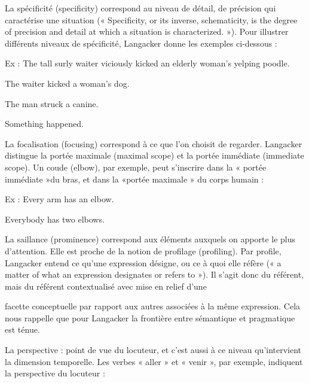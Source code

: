 \noindent{\color{BellaTeal}$\diamond$}\hspace{.6em}La spécificité (specificity) correspond au niveau de détail, de précision qui caractérise une situation (« Specificity, or its inverse, schematicity, is the degree of precision and detail at which a situation is characterized. »). Pour illustrer différents niveaux de spécificité, Langacker donne les exemples ci-dessous :\par

Ex : The tall surly waiter viciously kicked an elderly woman’s yelping poodle.\par

The waiter kicked a woman’s dog.\par The man struck a canine.\par Something happened.\par

\noindent{\color{BellaTeal}$\diamond$}\hspace{.6em}La focalisation (focusing) correspond à ce que l’on choisit de regarder. Langacker distingue la portée maximale (maximal scope) et la portée immédiate (immediate scope). Un coude (elbow), par exemple, peut s'inscrire dans la « portée immédiate »du bras, et dans la «portée maximale » du corps humain :\par

Ex : Every arm has an elbow.\par

Everybody has two elbows.\par

\noindent{\color{BellaTeal}$\diamond$}\hspace{.6em}La saillance (prominence) correspond aux éléments auxquels on apporte le plus d’attention. Elle est proche de la notion de profilage (profiling). Par profile, Langacker entend ce qu’une expression désigne, ou ce à quoi elle réfère (« a matter of what an expression designates or refers to »). Il s’agit donc du référent, mais du référent contextualisé avec mise en relief d’une\par


facette conceptuelle par rapport aux autres associées à la même expression. Cela nous rappelle que pour Langacker la frontière entre sémantique et pragmatique est ténue.\par

\noindent{\color{BellaTeal}$\diamond$}\hspace{.6em}La perspective : point de vue du locuteur, et c’est aussi à ce niveau qu’intervient la dimension temporelle. Les verbes « aller » et « venir », par exemple, indiquent la perspective du locuteur :\par

